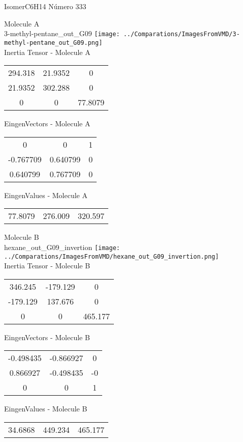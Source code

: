  \newpage

\vtab[-2cm]
\begin{center}
{\large IsomerC6H14 \tab Número 333}
\end{center}
\begin{multicols}{2}
\begin{center}

Molecule A \\ 
3-methyl-pentane\_out\_G09
\texttt{[image: ../Comparations/ImagesFromVMD/3-methyl-pentane\_out\_G09.png]}
\\
Inertia Tensor - Molecule A \\
\vtab

\begin{tabular}{|c c c|}
294.318	 & 	21.9352	 & 	0	 \\
21.9352	 & 	302.288	 & 	0	 \\
0	 & 	0	 & 	77.8079
\end{tabular}

\vtab
 EingenVectors - Molecule A     \\
\vtab
\begin{tabular}{|c c c|}
0	 & 	0	 & 	1	 \\
-0.767709	 & 	0.640799	 & 	0	 \\
0.640799	 & 	0.767709	 & 	0
\end{tabular}

\vtab
 EingenValues - Molecule A     \\
\vtab
\begin{tabular}{|c c c|}
77.8079	 & 	276.009	 & 	320.597	 \\
\end{tabular}
\columnbreak

Molecule B \\ 
hexane\_out\_G09\_invertion
\texttt{[image: ../Comparations/ImagesFromVMD/hexane\_out\_G09\_invertion.png]}
\\
Inertia Tensor - Molecule B \\
\vtab

\begin{tabular}{|c c c|}
346.245	 & 	-179.129	 & 	0	 \\
-179.129	 & 	137.676	 & 	0	 \\
0	 & 	0	 & 	465.177
\end{tabular}

\vtab
 EingenVectors - Molecule B     \\
\vtab
\begin{tabular}{|c c c|}
-0.498435	 & 	-0.866927	 & 	0	 \\
0.866927	 & 	-0.498435	 & 	-0	 \\
0	 & 	0	 & 	1
\end{tabular}

\vtab
 EingenValues - Molecule B     \\
\vtab
\begin{tabular}{|c c c|}
34.6868	 & 	449.234	 & 	465.177	 \\
\end{tabular}

\end{center}
\end{multicols}
